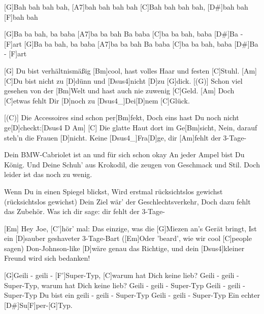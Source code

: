 
\chordscheme[%
	name = C',%
	finger = {1/2, 2/4, 3/5},%
	ring = {1, 3}]
\chordscheme[%
	name = F',%
	barre = {1/1-6},%
	finger = {2/3, 3/4, 3/5}]

\begin{guitar}
	[G]Bah bah bah bah, [A7]bah bah bah bah
	[C]Bah bah bah bah, [D#]bah bah [F]bah bah
	
	[G]Ba ba bah, ba baba [A7]ba ba bah
	Ba baba [C]ba ba bah, baba [D#]Ba - [F]art
	[G]Ba ba bah, ba baba [A7]ba ba bah
	Ba baba [C]ba ba bah, baba [D#]Ba - [F]art
	
	[G] Du bist verhältnismäßig [Bm]cool, hast volles Haar und festen [C]Stuhl. [Am]{}
	[C]Du bist nicht zu [D]dünn und [{\color{gray}Dsus4}]nicht [{\color{gray}D}]zu [G]dick.
	[(G)] Schon viel gesehen von der [Bm]Welt und hast auch nie zuwenig [C]Geld. [Am]{}
	Doch [C]etwas fehlt Dir [D]noch zu [{\color{gray}Dsus4}_]{Dei}[{\color{gray}D}]nem [C]Glück.
	
	[(C)] Die Accessoires sind schon per[Bm]fekt, 
	Doch eins hast Du noch nicht ge[D]checkt:[{\color{gray}Dsus4 D}  Am]{}
	[C] Die glatte Haut dort im Ge[Bm]sicht, 
	Nein, darauf steh'n die Frauen [D]nicht. Keine [{\color{gray}Dsus4}_]{Fra}[{\color{gray}D}]ge, dir [Am]fehlt der 3-Tage-
	
	 
	
	Dein BMW-Cabriolet ist an und für sich schon okay
	An jeder Ampel bist Du König.
	Und Deine Schuh' aus Krokodil, die zeugen von Geschmack und Stil.
	Doch leider ist das noch zu wenig.
	
	\pagebreak
	Wenn Du in einen Spiegel blickst,
	Wird erstmal rücksichtslos gewichst (rücksichtslos gewichst)
	Dein Ziel wär' der Geschlechtsverkehr,
	Doch dazu fehlt das Zubehör. Was ich dir sage: dir fehlt der 3-Tage-
	
	 
	
	[Em] Hey Joe, [C']hör' mal:
	Das einzige, was die [G]Miezen an's Gerät bringt,
	Ist ein [D]sauber geshaveter 3-Tage-Bart
	([Em]Oder 'beard', wie wir cool [C]people sagen)
	Don-Johnson-like [D]wäre genau das Richtige, 
	und dein [Dsus4]kleiner Freund wird sich bedanken!
	
	[G]Geili - geili - [F']Super-Typ, [C]warum hat Dich keine lieb?
	Geili - geili - Super-Typ, warum hat Dich keine lieb?
	Geili - geili - Super-Typ
	Geili - geili - Super-Typ
	Du bist ein geili - geili - Super-Typ
	Geili - geili - Super-Typ
	Ein echter [D#]Su[F]per-[{\color{gray}G}]Typ.
	
\end{guitar}